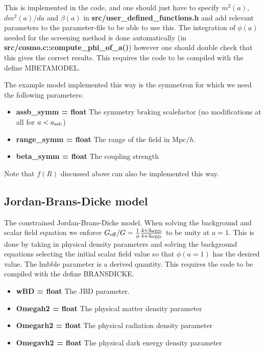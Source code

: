 \documentclass[usenatbib]{article}
\begin{document}
This is implemented in the code, and one should just have to specify $m^2(a)$, $dm^2(a)/da$ and $\beta(a)$ in \textbf{src/user\_defined\_functions.h} and add relevant parameters to the parameter-file to be able to use this. The integration of $\phi(a)$ needed for the screening method is done automatically (in \textbf{src/cosmo.c::compute\_phi\_of\_a()}) however one should double check that this gives the correct results. This requires the code to be compiled with the define MBETAMODEL.

The example model implemented this way is the symmetron for which we need the following parameters:
\begin{itemize}

\item \textbf{assb\_symm = float} The symmetry braking scalefactor (no modifications at all for $a<a_{\rm ssb}$)
\item \textbf{range\_symm = float} The range of the field in Mpc$/h$.
\item \textbf{beta\_symm = float} The coupling strength

\end{itemize}
Note that $f(R)$ discussed above can also be implemented this way.

\subsection*{Jordan-Brans-Dicke model}

The constrained Jordan-Brans-Dicke model. When solving the background and scalar field equation we enforce $G_{\rm eff}/G = \frac{1}{\phi} \frac{4+3\omega_{\rm BD}}{4+3\omega_{\rm BD}}$ to be unity at $a=1$. This is done by taking in physical density parameters and solving the background equations selecting the initial scalar field value so that $\phi(a=1)$ has the desired value. The hubble parameter is a derived quantity. This requires the code to be compiled with the define BRANSDICKE.

\begin{itemize}

\item \textbf{wBD = float} The JBD parameter.
\item \textbf{Omegah2 = float} The physical matter density parameter
\item \textbf{Omegarh2 = float} The physical radiation density parameter
\item \textbf{Omegavh2 = float} The physical dark energy density parameter

\end{itemize}
\end{document}
